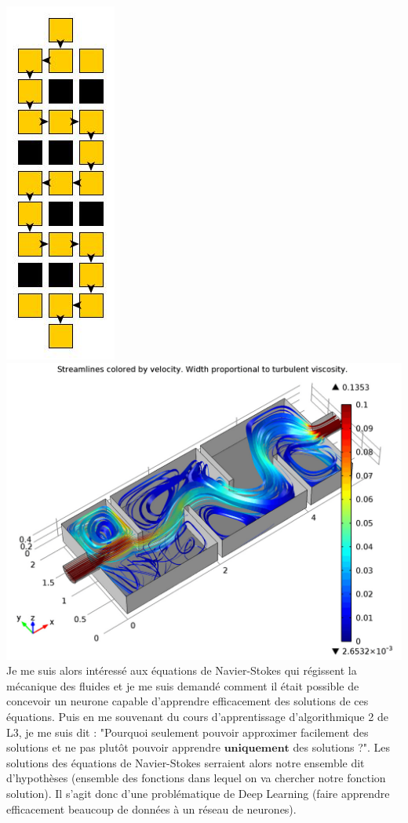 \documentclass[10pt]{article}
\begin{document}
\includegraphics[scale=0.45]{ex_maze.jpg} \indent\indent
\includegraphics[scale=0.20]{navier.png}\\

Je me suis alors intéressé aux équations de Navier-Stokes qui régissent la mécanique des fluides et je me suis demandé comment il était possible de concevoir un neurone capable d'apprendre efficacement des solutions de ces équations. Puis en me souvenant du cours d'apprentissage d'algorithmique 2 de L3, je me suis dit : "Pourquoi seulement pouvoir approximer facilement des solutions et ne pas plutôt pouvoir apprendre $\textbf{uniquement}$ des solutions ?". Les solutions des équations de Navier-Stokes serraient alors notre ensemble dit d'hypothèses (ensemble des fonctions dans lequel on va chercher notre fonction solution). Il s'agit donc d'une problématique de Deep Learning (faire apprendre efficacement beaucoup de données à un réseau de neurones).
\end{document}

